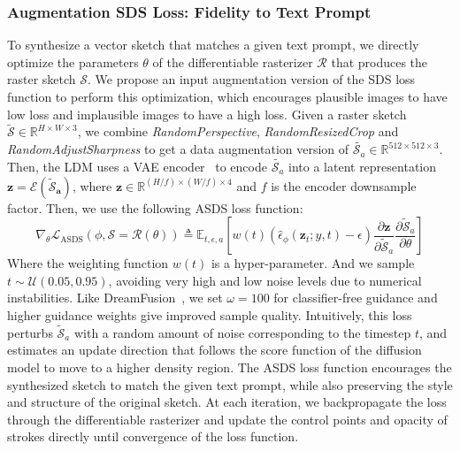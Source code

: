 \documentclass{article}
\begin{document}
\subsubsection{Augmentation SDS Loss: Fidelity to Text Prompt}
\label{sec:ASDS_loss}
To synthesize a vector sketch that matches a given text prompt, we directly optimize the parameters $\theta$ of the differentiable rasterizer $\mathcal{R}$ that produces the raster sketch $\mathcal{S}$.
We propose an input augmentation version of the SDS loss function to perform this optimization, which encourages plausible images to have low loss and implausible images to have a high loss. 
Given a raster sketch $\tilde{\mathcal{S}} \in \mathbb{R}^{H \times W \times 3}$, we combine \textit{RandomPerspective}, \textit{RandomResizedCrop} and \textit{RandomAdjustSharpness} to get a data augmentation version of $\tilde{\mathcal{S}_a} \in \mathbb{R}^{512 \times 512 \times 3}$.
Then, the LDM uses a VAE encoder~\cite{taming_2021_esser} to encode $\tilde{\mathcal{S}_a}$ into a latent representation $\mathbf{z} = \mathcal{E}(\mathbf{\tilde{\mathcal{S}}_a})$, where $\mathbf{z} \in \mathbb{R}^{(H / f) \times (W / f) \times 4}$ and $f$ is the encoder downsample factor.
Then, we use the following ASDS loss function:
\begin{equation}
\nabla_{\theta} \mathcal{L}_{\mathrm{ASDS}} (\phi, \mathcal{S} = \mathcal{R}(\theta)) \triangleq 
\mathbb{E}_{t,\epsilon,a} 
\left[ 
w(t) (\hat{\epsilon}_{\phi}(\mathbf{z}_t;y,t) - \epsilon) 
\frac{\partial \mathbf{z}}{\partial \tilde{\mathcal{S}}_a}
\frac{\partial \tilde{\mathcal{S}}_a}{\partial \theta}
\right]
\end{equation}
Where the weighting function $w(t)$ is a hyper-parameter. And we sample $t \sim \mathcal{U}(0.05, 0.95)$, avoiding very high and low noise levels due to numerical instabilities. Like DreamFusion~\cite{poole_2023_dreamfusion}, we set $\omega = 100$ for classifier-free guidance and higher guidance weights give improved sample quality.
Intuitively, this loss perturbs $\tilde{\mathcal{S}}_a$ with a random amount of noise corresponding to the timestep $t$, and estimates an update direction that follows the score function of the diffusion model to move to a higher density region.
The ASDS loss function encourages the synthesized sketch to match the given text prompt, while also preserving the style and structure of the original sketch.
At each iteration, we backpropagate the loss through the differentiable rasterizer and update the control points and opacity of strokes directly until convergence of the loss function.
\end{document}
